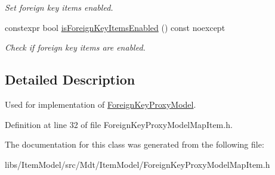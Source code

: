 \begin{DoxyCompactItemize}
\begin{DoxyCompactList}\small\item\em Set foreign key items enabled. \end{DoxyCompactList}\item 
constexpr bool \hyperlink{class_mdt_1_1_item_model_1_1_foreign_key_proxy_model_map_item_flags_afb9a4feeb452d0ddcd90009bc0847cea}{is\+Foreign\+Key\+Items\+Enabled} () const noexcept\hypertarget{class_mdt_1_1_item_model_1_1_foreign_key_proxy_model_map_item_flags_afb9a4feeb452d0ddcd90009bc0847cea}{}\label{class_mdt_1_1_item_model_1_1_foreign_key_proxy_model_map_item_flags_afb9a4feeb452d0ddcd90009bc0847cea}

\begin{DoxyCompactList}\small\item\em Check if foreign key items are enabled. \end{DoxyCompactList}\end{DoxyCompactItemize}


\subsection{Detailed Description}
Used for implementation of \hyperlink{class_mdt_1_1_item_model_1_1_foreign_key_proxy_model}{Foreign\+Key\+Proxy\+Model}. 

Definition at line 32 of file Foreign\+Key\+Proxy\+Model\+Map\+Item.\+h.



The documentation for this class was generated from the following file\+:\begin{DoxyCompactItemize}
\item 
libs/\+Item\+Model/src/\+Mdt/\+Item\+Model/Foreign\+Key\+Proxy\+Model\+Map\+Item.\+h\end{DoxyCompactItemize}

